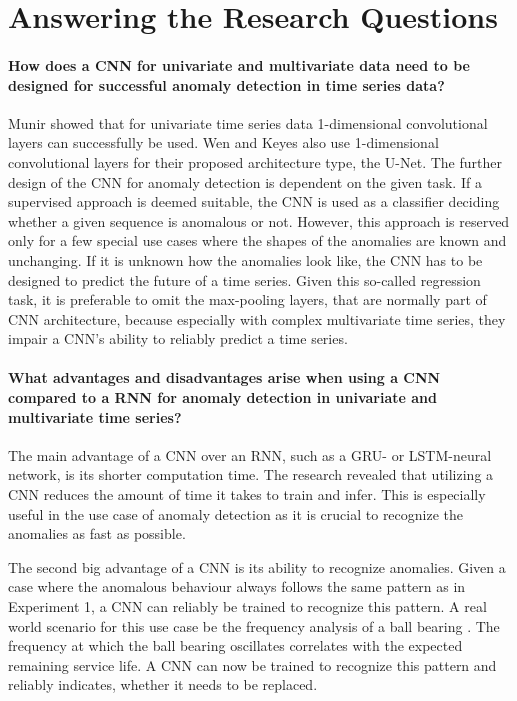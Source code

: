 \section{Answering the Research Questions}


\paragraph{How does a CNN for univariate and multivariate data need to be designed for successful anomaly detection in time series data?}

Munir \parencite*{Munir2019} showed that for univariate time series data 1-dimensional convolutional layers can successfully be used. Wen and Keyes \parencite*{Wen2019} also use 1-dimensional convolutional layers for their proposed architecture type, the U-Net. The further design of the CNN for anomaly detection is dependent on the given task. If a supervised approach is deemed suitable, the CNN is used as a classifier deciding whether a given sequence is anomalous or not. However, this approach is reserved only for a few special use cases where the shapes of the anomalies are known and unchanging. If it is unknown how the anomalies look like, the CNN has to be designed to predict the future of a time series. Given this so-called regression task, it is preferable to omit the max-pooling layers, that are normally part of CNN architecture, because especially with complex multivariate time series, they impair a CNN's ability to reliably predict a time series.  

\paragraph{What advantages and disadvantages arise when using a CNN compared to a RNN for anomaly detection in univariate and multivariate time series?} The main advantage of a CNN over an RNN, such as a GRU- or LSTM-neural network, is its shorter computation time. The research revealed that utilizing a CNN reduces the amount of time it takes to train and infer. This is especially useful in the use case of anomaly detection as it is crucial to recognize the anomalies as fast as possible.

The second big advantage of a CNN is its ability to recognize anomalies. Given a case where the anomalous behaviour always follows the same pattern as in Experiment 1, a CNN can reliably be trained to recognize this pattern. A real world scenario for this use case be the frequency analysis of a ball bearing \parencite{Mais2002}. The frequency at which the ball bearing oscillates correlates with the expected remaining service life. A CNN can now be trained to recognize this pattern and reliably indicates, whether it needs to be replaced.

